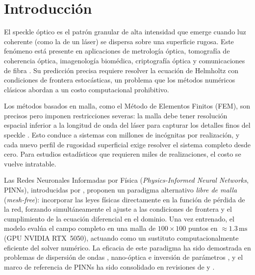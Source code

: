 
\section{Introducción}
\label{sec:intro}

El speckle óptico es el patrón granular de alta intensidad que emerge cuando luz coherente
(como la de un láser) se dispersa sobre una superficie rugosa.
Este fenómeno está presente en aplicaciones de metrología óptica, tomografía de coherencia
óptica, imagenología biomédica, criptografía óptica y comunicaciones de fibra
\citep{Goodman2007_Speckle}.
Su predicción precisa requiere resolver la ecuación de Helmholtz con condiciones de frontera
estocásticas, un problema que los métodos numéricos clásicos abordan a un costo computacional
prohibitivo.

Los métodos basados en malla, como el Método de Elementos Finitos (FEM), son precisos pero
imponen restricciones severas: la malla debe tener resolución espacial inferior a la longitud
de onda del láser para capturar los detalles finos del speckle \citep{Jin2014_FEM}.
Esto conduce a sistemas con millones de incógnitas por realización, y cada nuevo perfil de
rugosidad superficial exige resolver el sistema completo desde cero.
Para estudios estadísticos que requieren miles de realizaciones, el costo se vuelve intratable.

Las Redes Neuronales Informadas por Física (\textit{Physics-Informed Neural Networks},
PINNs), introducidas por \citet{Raissi2019_PINNs}, proponen un paradigma alternativo
\textit{libre de malla} (\textit{mesh-free}): incorporar las leyes físicas directamente en la
función de pérdida de la red, forzando simultáneamente el ajuste a las condiciones de frontera
y el cumplimiento de la ecuación diferencial en el dominio.
Una vez entrenado, el modelo evalúa el campo completo en una malla de
$100 \times 100$ puntos en $\approx 1.3\,\mathrm{ms}$ (GPU NVIDIA RTX~5050),
actuando como un sustituto computacionalmente eficiente del solver numérico.
La eficacia de este paradigma ha sido demostrada en problemas de dispersión de ondas
\citep{Fang2020_scattering}, nano-óptica e inversión de parámetros
\citep{Chen2020_nanoptics}, y el marco de referencia de PINNs ha sido consolidado
en revisiones de \citet{Karniadakis2021_review} y \citet{Cuomo2022_review}.

